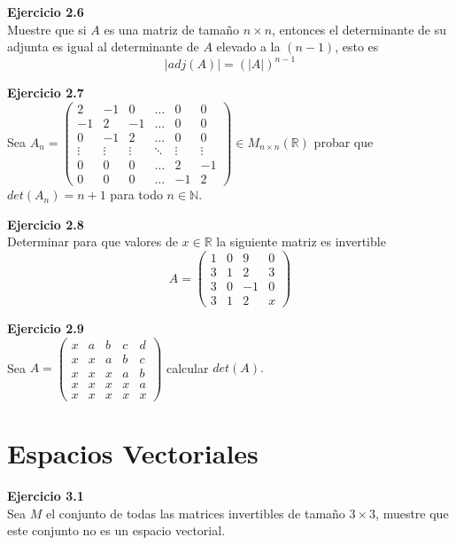 \documentclass{article}
\newenvironment{problem}[2][Ejercicio]
    { \begin{mdframed}[backgroundcolor=gray!20] \textbf{#1 #2} \\}
    {  \end{mdframed}}
\begin{document}
\begin{problem}{2.6}
    Muestre que si $A$ es una matriz de tamaño $n\times n$, entonces el determinante de su adjunta es igual al determinante de $A$ elevado a la $(n - 1)$, esto es
\[
|adj(A)| = (|A|)^{n-1}
\]
\end{problem}
\begin{problem}{2.7}
    Sea $A_n = \begin{pmatrix} 2 & -1 & 0 & \dots & 0 & 0 \\ -1 & 2 & -1 & \dots & 0 & 0 \\ 0 & -1 & 2 & \dots & 0 & 0 \\ \vdots & \vdots & \vdots & \ddots & \vdots & \vdots \\ 0 & 0 & 0 & \dots & 2 & -1 \\ 0 & 0 & 0 & \dots & -1 & 2 \end{pmatrix} \in M_{n\times n}(\mathbb{R})$ probar que $det(A_n)=n+1$ para todo $n\in \mathbb{N}$.
\end{problem}
\newpage

\begin{problem}{2.8}
    Determinar para que valores de $x\in \mathbb{R}$ la siguiente matriz es invertible
\[
A = \begin{pmatrix}
1 & 0 & 9 & 0 \\
3 & 1 & 2 & 3 \\
3 & 0 & -1 & 0 \\
3 & 1 & 2 & x
\end{pmatrix}
\]
\end{problem}

\begin{problem}{2.9}
    Sea $A =  \begin{pmatrix} x & a & b & c & d \\ x & x & a & b & c \\ x & x & x & a & b \\  x & x & x & x & a \\ x & x & x & x & x \end{pmatrix}$ calcular $det(A).$
\end{problem}

\section{Espacios Vectoriales}\label{sec:esp-vectoriales}

\begin{problem}{3.1}
    Sea $M$ el conjunto de todas las matrices invertibles de tamaño $3 \times 3$, muestre que este conjunto no es un espacio vectorial.
\end{problem}
\end{document}
